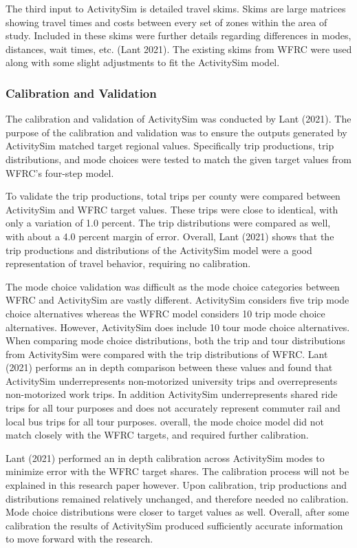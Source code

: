 \documentclass[12pt, oneside, openright]{byuthesis}
\begin{document}
The third input to ActivitySim is detailed travel skims. Skims are large matrices showing travel times and costs between every set of zones within the area of study. Included in these skims were further details regarding differences in modes, distances, wait times, etc. (Lant 2021). The existing skims from WFRC were used along with some slight adjustments to fit the ActivitySim model.

\hypertarget{asimcal}{%
\subsubsection{Calibration and Validation}\label{asimcal}}

The calibration and validation of ActivitySim was conducted by Lant (2021). The purpose of the calibration and validation was to ensure the outputs generated by ActivitySim matched target regional values. Specifically trip productions, trip distributions, and mode choices were tested to match the given target values from WFRC's four-step model.

To validate the trip productions, total trips per county were compared between ActivitySim and WFRC target values. These trips were close to identical, with only a variation of 1.0 percent. The trip distributions were compared as well, with about a 4.0 percent margin of error. Overall, Lant (2021) shows that the trip productions and distributions of the ActivitySim model were a good representation of travel behavior, requiring no calibration.

The mode choice validation was difficult as the mode choice categories between WFRC and ActivitySim are vastly different. ActivitySim considers five trip mode choice alternatives whereas the WFRC model considers 10 trip mode choice alternatives. However, ActivitySim does include 10 tour mode choice alternatives. When comparing mode choice distributions, both the trip and tour distributions from ActivitySim were compared with the trip distributions of WFRC. Lant (2021) performs an in depth comparison between these values and found that ActivitySim underrepresents non-motorized university trips and overrepresents non-motorized work trips. In addition ActivitySim underrepresents shared ride trips for all tour purposes and does not accurately represent commuter rail and local bus trips for all tour purposes. overall, the mode choice model did not match closely with the WFRC targets, and required further calibration.

Lant (2021) performed an in depth calibration across ActivitySim modes to minimize error with the WFRC target shares. The calibration process will not be explained in this research paper however. Upon calibration, trip productions and distributions remained relatively unchanged, and therefore needed no calibration. Mode choice distributions were closer to target values as well. Overall, after some calibration the results of ActivitySim produced sufficiently accurate information to move forward with the research.
\end{document}
